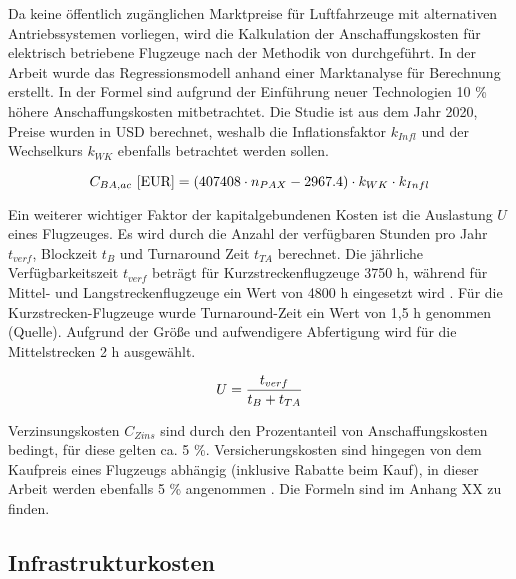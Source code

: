 Da keine öffentlich zugänglichen Marktpreise für Luftfahrzeuge mit alternativen Antriebssystemen vorliegen, 
wird die Kalkulation der Anschaffungskosten für elektrisch betriebene Flugzeuge nach der Methodik von \cite{monjon2020conceptual} durchgeführt. 
In der Arbeit wurde das Regressionsmodell anhand einer Marktanalyse für Berechnung erstellt. 
In der Formel sind aufgrund der Einführung neuer Technologien 10 \% höhere Anschaffungskosten mitbetrachtet. 
Die Studie ist aus dem Jahr 2020, Preise wurden in USD berechnet, weshalb die Inflationsfaktor $k_{Infl}$ und
der Wechselkurs $k_{WK}$ ebenfalls betrachtet werden sollen.

\begin{equation}
   {C_{BA,ac} ~[\text{EUR}]} = (407408 \cdot n_{PAX} - 2967.4) \cdot k_{WK} \cdot {k_{Infl}}\\
   \label{price BA}
\end{equation}

Ein weiterer wichtiger Faktor der kapitalgebundenen Kosten ist die Auslastung $U$ eines Flugzeuges. Es wird durch die Anzahl 
der verfügbaren Stunden pro Jahr $t_{verf}$, Blockzeit $t_B$ und Turnaround Zeit $t_{TA}$ berechnet. 
Die jährliche Verfügbarkeitszeit $t_{verf}$ beträgt für Kurzstreckenflugzeuge 3750 h, 
während für Mittel- und Langstreckenflugzeuge ein Wert von 4800 h eingesetzt wird \cite{scholz_design_evaluation_doc}. Für die Kurzstrecken-Flugzeuge 
wurde Turnaround-Zeit ein Wert von 1,5 h genommen (Quelle). Aufgrund der Größe und aufwendigere Abfertigung wird für die Mittelstrecken 2 h ausgewählt.

\begin{equation}
   U = \frac{t_{verf}}{t_B + t_{TA}} \\
   \label{utilisation}
\end{equation}

Verzinsungskosten $C_{Zins}$ sind durch den Prozentanteil von Anschaffungskosten bedingt, für diese gelten ca. 5 \%. 
Versicherungskosten sind hingegen von dem Kaufpreis eines Flugzeugs abhängig (inklusive Rabatte beim Kauf), 
in dieser Arbeit werden ebenfalls 5 \% angenommen \cite{scholz_design_evaluation_doc}. Die Formeln sind im Anhang XX zu finden.
%
\subsection{Infrastrukturkosten}

